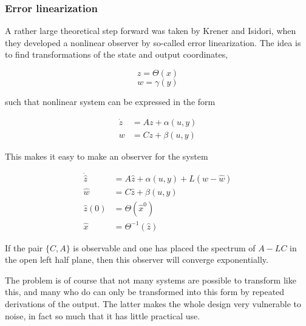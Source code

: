 \subsubsection{Error linearization}

A rather large theoretical step forward was taken by Krener and Isidori\cite{FirstErrorLinNonlinObs}, when they developed a nonlinear observer by so-called error linearization. The idea is to find transformations of the state and output coordinates, 

\begin{equation}
    z = \Theta(x)
\end{equation}
\begin{equation}
    w = \gamma(y)
\end{equation}

such that nonlinear system can be expressed in the form

\begin{align}
    \Dot{z} &= Az + \alpha(u,y) \\
    w &= Cz + \beta(u,y)
\end{align}

This makes it easy to make an observer for the system

\begin{align}
    \Dot{\hat{z}} &= A\hat{z} + \alpha(u,y) + L(w-\hat{w}) \\
    \hat{w} &= C\hat{z} + \beta(u,y) \\
    \hat{z}(0) &= \Theta(\hat{x}^0) \\ 
    \hat{x} &= \Theta^{-1}(\hat{z})
\end{align}

If the pair $\{C,A\}$ is observable and one has placed the spectrum of $A-LC$ in the open left half plane, then this observer will converge exponentially. 

The problem is of course that not many systems are possible to transform like this, and many who do can only be transformed into this form by repeated derivations of the output. The latter makes the whole design very vulnerable to noise, in fact so much that it has little practical use. 


